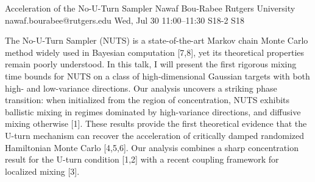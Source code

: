 \begin{talk}
  {Acceleration of the No-U-Turn Sampler}%
  {Nawaf Bou-Rabee}%
  {Rutgers University}%
  {nawaf.bourabee@rutgers.edu}%
  {}%
  {}%
  {Wed, Jul 30 11:00–11:30}%
  {S18-2}%
  {S18}%
  {}%
  
				
			

\medskip

The No-U-Turn Sampler (NUTS) is a state-of-the-art Markov chain Monte Carlo method widely used in Bayesian computation [7,8], yet its theoretical properties remain poorly understood. In this talk, I will present the first rigorous mixing time bounds for NUTS on a class of high-dimensional Gaussian targets with both high- and low-variance directions. Our analysis uncovers a striking phase transition: when initialized from the region of concentration, NUTS exhibits ballistic mixing in regimes dominated by high-variance directions, and diffusive mixing otherwise [1]. These results provide the first theoretical evidence that the U-turn mechanism can recover the acceleration of critically damped randomized Hamiltonian Monte Carlo [4,5,6].  Our analysis combines a sharp concentration result for the U-turn condition [1,2] with a recent coupling framework for localized mixing [3]. 


\end{talk}

